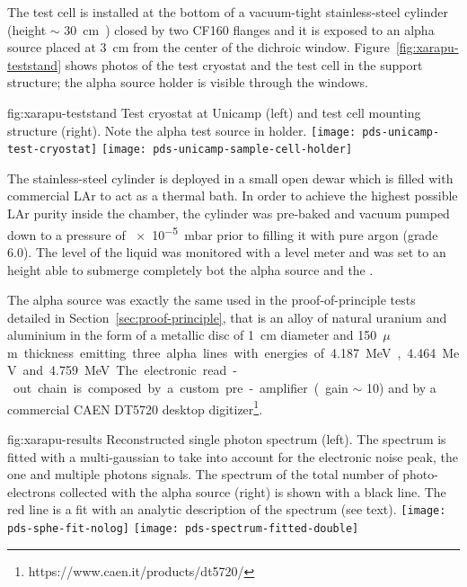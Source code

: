 The test cell is installed at the bottom of a  vacuum-tight  stainless-steel cylinder (height $\sim$ \SI{30}{cm)} closed by two CF160 flanges and it is exposed to an alpha source placed at \SI{3}{cm} from the center of the dichroic window. Figure~\ref{fig:xarapu-teststand} shows photos of the test cryostat and the test cell in the support structure; the alpha source holder is visible through the windows.

\begin{dunefigure}{fig:xarapu-teststand}
{Test cryostat at Unicamp (left) and  test cell mounting structure (right).  Note the alpha test source in holder.} 
	\texttt{[image: pds-unicamp-test-cryostat]} \quad
	\texttt{[image: pds-unicamp-sample-cell-holder]}
\end{dunefigure}  

The stainless-steel cylinder  is deployed in a small open dewar which is filled with commercial LAr to act as a thermal bath. In order to achieve the highest possible LAr purity inside the  chamber, the cylinder was pre-baked and vacuum pumped down to a pressure of \SI{e-5}{mbar}  %
prior to filling it with pure argon (grade 6.0). The level of the liquid was monitored with a level meter and was set to an height able to submerge completely bot the alpha source and the . 

The alpha source was exactly the same used in the  proof-of-principle tests detailed in Section~\ref{sec:proof-principle}, that is an alloy of natural uranium and aluminium in the form of a metallic disc of \SI{1}{cm} diameter and \SI{150}{$\mu$m} thickness emitting three alpha lines with energies of  \SI{4.187}{MeV}, \SI{4.464}{MeV} and  \SI{4.759}{MeV}.  The electronic read-out chain is composed by a custom pre-amplifier (gain $\sim$ 10) and by a commercial CAEN DT5720 desktop digitizer\footnote{https://www.caen.it/products/dt5720/}.

\begin{dunefigure}{fig:xarapu-results}
{Reconstructed single photon spectrum (left). The spectrum is fitted with a multi-gaussian to take into account for the electronic noise peak, the one and multiple photons signals. The  spectrum of the total number of photo-electrons collected with the alpha source (right) is shown with a black line. The red line is a fit with an analytic description of the spectrum (see text).} 
	\texttt{[image: pds-sphe-fit-nolog]} \quad
	\texttt{[image: pds-spectrum-fitted-double]}
\end{dunefigure}  


